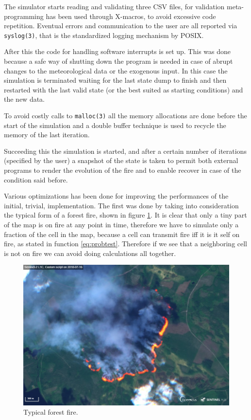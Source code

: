 \documentclass[Lau]{sapthesis} %
\begin{document}
The simulator starts reading and validating three CSV files, for validation
meta-programming has been used through X-macros, to avoid excessive code
repetition. Eventual errors and communication to the user are all reported via
\texttt{syslog(3)}, that is the standardized logging mechanism by POSIX.

After this the code for handling software interrupts is set up. This was done
because a safe way of shutting down the program is needed in case of abrupt
changes to the meteorological data or the exogenous input. In this case the
simulation is terminated waiting for the last state dump to finish and then
restarted with the last valid state (or the best suited as starting conditions)
and the new data.

To avoid costly calls to \texttt{malloc(3)} all the memory allocations are done
before the start of the simulation and a double buffer technique is used to
recycle the memory of the last iteration.

Succeeding this the simulation is started, and after a certain number of
iterations (specified by the user) a snapshot of the state is taken to permit
both external programs to render the evolution of the fire and to enable recover
in case of the condition said before.

Various optimizations has been done for improving the performances of the
initial, trivial, implementation. The first was done by taking into
consideration the typical form of a forest fire, shown in figure \ref{fig:fire}.
It is clear that only a tiny part of the map is on fire at any point in time,
therefore we have to simulate only a fraction of the cell in the map, because a
cell can transmit fire iff it is it self on fire, as stated in function
\ref{eq:probtest}. Therefore if we see that a neighboring cell is not on fire
we can avoid doing calculations all together.

\begin{figure}
\centering
\includegraphics[scale=0.2]{fire.jpg}
\caption{Typical forest fire.}
\label{fig:fire}
\end{figure}
\end{document}
